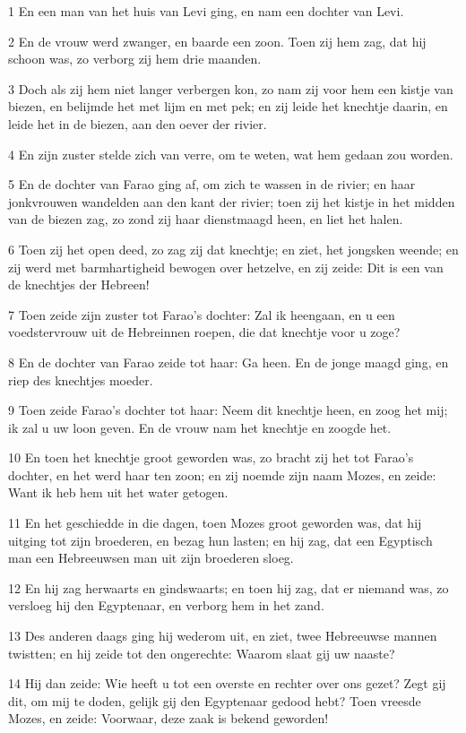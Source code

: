 \par 1 En een man van het huis van Levi ging, en nam een dochter van Levi.
\par 2 En de vrouw werd zwanger, en baarde een zoon. Toen zij hem zag, dat hij schoon was, zo verborg zij hem drie maanden.
\par 3 Doch als zij hem niet langer verbergen kon, zo nam zij voor hem een kistje van biezen, en belijmde het met lijm en met pek; en zij leide het knechtje daarin, en leide het in de biezen, aan den oever der rivier.
\par 4 En zijn zuster stelde zich van verre, om te weten, wat hem gedaan zou worden.
\par 5 En de dochter van Farao ging af, om zich te wassen in de rivier; en haar jonkvrouwen wandelden aan den kant der rivier; toen zij het kistje in het midden van de biezen zag, zo zond zij haar dienstmaagd heen, en liet het halen.
\par 6 Toen zij het open deed, zo zag zij dat knechtje; en ziet, het jongsken weende; en zij werd met barmhartigheid bewogen over hetzelve, en zij zeide: Dit is een van de knechtjes der Hebreen!
\par 7 Toen zeide zijn zuster tot Farao's dochter: Zal ik heengaan, en u een voedstervrouw uit de Hebreinnen roepen, die dat knechtje voor u zoge?
\par 8 En de dochter van Farao zeide tot haar: Ga heen. En de jonge maagd ging, en riep des knechtjes moeder.
\par 9 Toen zeide Farao's dochter tot haar: Neem dit knechtje heen, en zoog het mij; ik zal u uw loon geven. En de vrouw nam het knechtje en zoogde het.
\par 10 En toen het knechtje groot geworden was, zo bracht zij het tot Farao's dochter, en het werd haar ten zoon; en zij noemde zijn naam Mozes, en zeide: Want ik heb hem uit het water getogen.
\par 11 En het geschiedde in die dagen, toen Mozes groot geworden was, dat hij uitging tot zijn broederen, en bezag hun lasten; en hij zag, dat een Egyptisch man een Hebreeuwsen man uit zijn broederen sloeg.
\par 12 En hij zag herwaarts en gindswaarts; en toen hij zag, dat er niemand was, zo versloeg hij den Egyptenaar, en verborg hem in het zand.
\par 13 Des anderen daags ging hij wederom uit, en ziet, twee Hebreeuwse mannen twistten; en hij zeide tot den ongerechte: Waarom slaat gij uw naaste?
\par 14 Hij dan zeide: Wie heeft u tot een overste en rechter over ons gezet? Zegt gij dit, om mij te doden, gelijk gij den Egyptenaar gedood hebt? Toen vreesde Mozes, en zeide: Voorwaar, deze zaak is bekend geworden!
